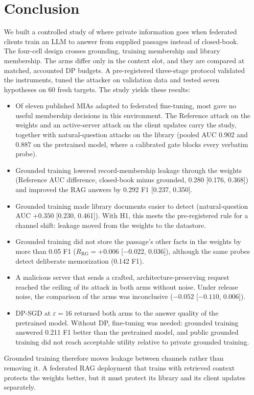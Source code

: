 \documentclass[11pt]{article}
\begin{document}
\section{Conclusion}\label{sec:conclusion}

We built a controlled study of where private information goes when federated clients train an LLM to answer from supplied passages instead of closed-book. The four-cell design crosses grounding, training membership and library membership. The arms differ only in the context slot, and they are compared at matched, accounted DP budgets. A pre-registered three-stage protocol validated the instruments, tuned the attacker on validation data and tested seven hypotheses on 60 fresh targets. The study yields these results:
\begin{itemize}
  \item Of eleven published MIAs adapted to federated fine-tuning, most gave no useful membership decisions in this environment. The Reference attack on the weights and an active-server attack on the client updates carry the study, together with natural-question attacks on the library (pooled AUC 0.902 and 0.887 on the pretrained model, where a calibrated gate blocks every verbatim probe).
  \item Grounded training lowered record-membership leakage through the weights (Reference AUC difference, closed-book minus grounded, 0.280 [0.176, 0.368]) and improved the RAG answers by 0.292 F1 [0.237, 0.350].
  \item Grounded training made library documents easier to detect (natural-question AUC $+0.350$ [0.230, 0.461]). With H1, this meets the pre-registered rule for a channel shift: leakage moved from the weights to the datastore.
  \item Grounded training did not store the passage's other facts in the weights by more than 0.05 F1 ($R_{\mathrm{RG}}=+0.006$ [$-0.022$, 0.036]), although the same probes detect deliberate memorization (0.142 F1).
  \item A malicious server that sends a crafted, architecture-preserving request reached the ceiling of its attack in both arms without noise. Under release noise, the comparison of the arms was inconclusive ($-0.052$ [$-0.110$, 0.006]).
  \item DP-SGD at $\varepsilon=16$ returned both arms to the answer quality of the pretrained model. Without DP, fine-tuning was needed: grounded training answered 0.211 F1 better than the pretrained model, and public grounded training did not reach acceptable utility relative to private grounded training.
\end{itemize}
Grounded training therefore moves leakage between channels rather than removing it. A federated RAG deployment that trains with retrieved context protects the weights better, but it must protect its library and its client updates separately.
\end{document}
